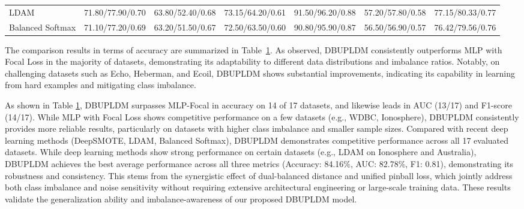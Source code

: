 \documentclass[a4paper]{cas-sc}
\begin{document}
\begin{table}[htbp]
{\begin{tabular}{lcccccc}
    {\color{magenta}LDAM} & {\color{magenta}71.80/77.90/0.70} & {\color{magenta}63.80/52.40/0.68} & {\color{magenta}73.15/64.20/0.61} & {\color{magenta}91.50/96.20/0.88} & {\color{magenta}57.20/57.80/0.58} & {\color{magenta}77.15/80.33/0.77} \\
    {\color{magenta}Balanced Softmax} & {\color{magenta}71.10/77.20/0.69} & {\color{magenta}63.20/51.50/0.67} & {\color{magenta}72.50/63.50/0.60} & {\color{magenta}90.80/95.90/0.87} & {\color{magenta}56.50/56.90/0.57} & {\color{magenta}76.42/79.56/0.76} \\
    \bottomrule
    \end{tabular}
  }
  \label{tab:performance_comparison}
\end{table}



{\color{blue}The comparison results in terms of accuracy are summarized in Table~\ref{tab:performance_comparison}. As observed, DBUPLDM consistently outperforms MLP with Focal Loss in the majority of datasets, demonstrating its adaptability to different data distributions and imbalance ratios. Notably, on challenging datasets such as Echo, Heberman, and Ecoil, DBUPLDM shows substantial improvements, indicating its capability in learning from hard examples and mitigating class imbalance.}


{\color{orange}As shown in Table \ref{tab:performance_comparison}, DBUPLDM surpasses MLP-Focal in accuracy on 14 of 17 datasets, and likewise leads in AUC (13/17) and F1-score (14/17).} {\color{blue} While MLP with Focal Loss shows competitive performance on a few datasets (e.g., WDBC, Ionosphere), DBUPLDM consistently provides more reliable results, particularly on datasets with higher class imbalance and smaller sample sizes.} {\color{magenta}Compared with recent deep learning methods (DeepSMOTE, LDAM, Balanced Softmax), DBUPLDM demonstrates competitive performance across all 17 evaluated datasets. While deep learning methods show strong performance on certain datasets (e.g., LDAM on Ionosphere and Australia), DBUPLDM achieves the best average performance across all three metrics (Accuracy: 84.16\%, AUC: 82.78\%, F1: 0.81), demonstrating its robustness and consistency. This stems from the synergistic effect of dual-balanced distance and unified pinball loss, which jointly address both class imbalance and noise sensitivity without requiring extensive architectural engineering or large-scale training data. These results validate the generalization ability and imbalance-awareness of our proposed DBUPLDM model.}
\end{document}
